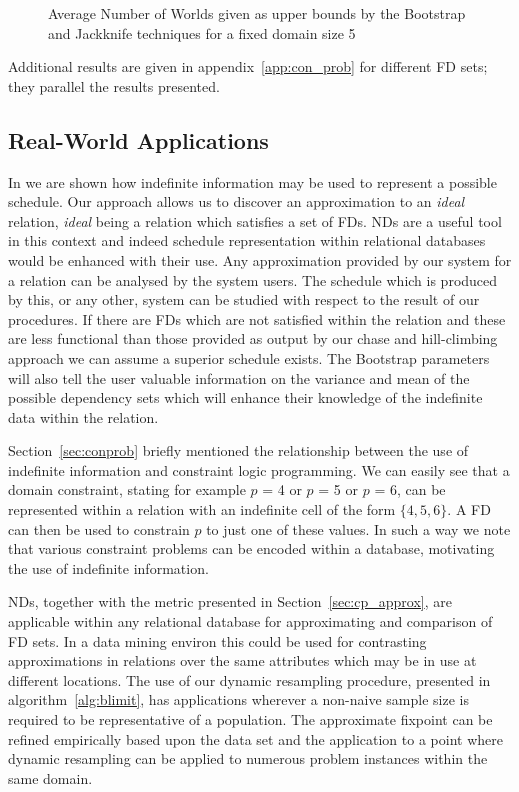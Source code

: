 \begin{figure}
\centerline{}
\caption{\label{graph:bj1} {Average Number of Worlds given as 
upper bounds by the Bootstrap and Jackknife techniques for a fixed domain
size 5}}
\end{figure}

Additional results are given in appendix~\ref{app:con_prob} for
different FD sets; they parallel the results presented.

\subsection{Real-World Applications}\label{sec:cp_apps}

In \cite{inv91} we are shown how indefinite information may be used to
represent a possible schedule. Our approach allows us to discover an
approximation to an {\em ideal} relation, {\em ideal} being a relation
which satisfies
a set of FDs. NDs are a useful tool in this context and indeed 
schedule representation within relational databases would be enhanced with
their use. Any approximation
provided by our system for a relation can be analysed by the system
users. The schedule which is produced by this, or any other, system can
be studied with respect to the result of our procedures. If there are
FDs which are not satisfied within the relation and these are less
functional than those provided as output by our chase and hill-climbing
approach we can assume a superior schedule exists. The Bootstrap
parameters will also tell the user valuable information on the
variance and mean of the possible dependency sets which will enhance
their knowledge of the indefinite data within the relation.

\medskip

Section~\ref{sec:conprob} briefly mentioned the relationship between
the use of indefinite information and constraint logic programming. We
can easily see that a domain constraint, stating for example $p$ = 4
or $p$ = 5 or $p$ = 6, can be represented within a relation with an
indefinite cell of the form $\{ 4, 5, 6 \}$. A FD can then be used to
constrain $p$ to just one of these values. In such a way we note that
various constraint problems can be encoded within a database,
motivating the use of indefinite information.

\medskip
 
NDs, together with the metric presented in
Section~\ref{sec:cp_approx}, are applicable 
within any relational database for approximating and comparison of FD sets.
In a data mining environ this could be used for contrasting approximations
in relations over the same attributes which may be in use at different
locations. The use of our dynamic resampling procedure, presented in
algorithm~\ref{alg:blimit}, has applications wherever a non-naive
sample size is required to be representative of a population. The
approximate fixpoint can be refined empirically based upon the data
set and the application to a point where dynamic resampling can be
applied to numerous problem instances within the same domain.
 

